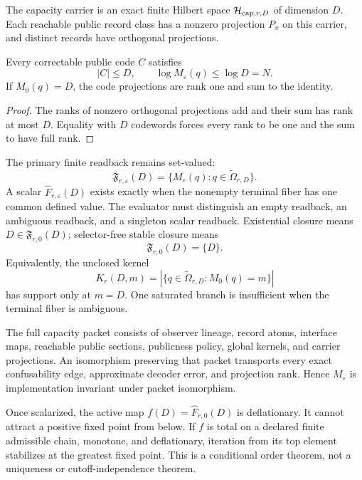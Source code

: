 The capacity carrier is an exact finite Hilbert space
\(\mathcal H_{{\rm cap},r,D}\) of dimension \(D\). Each reachable public
record class has a nonzero projection \(P_x\) on this carrier, and distinct
records have orthogonal projections.

\begin{theorem}
\label{thm:public-capacity-carrier-bound}
Every correctable public code \(C\) satisfies
\[
|C|\le D,
\qquad
\log M_\varepsilon(q)\le\log D=N.
\]
If \(M_0(q)=D\), the code projections are rank one and sum to the identity.
\end{theorem}

\begin{proof}
The ranks of nonzero orthogonal projections add and their sum has rank at
most \(D\). Equality with \(D\) codewords forces every rank to be one and
the sum to have full rank.
\end{proof}

The primary finite readback remains set-valued:
\[
\boxed{
\mathfrak F_{r,\varepsilon}(D)=
\{M_\varepsilon(q):q\in\widetilde\Omega_{r,D}\}.
}
\]
A scalar \(\widehat F_{r,\varepsilon}(D)\) exists exactly when the nonempty
terminal fiber has one common defined value. The evaluator must distinguish
an empty readback, an ambiguous readback, and a singleton scalar readback.
Existential closure means \(D\in\mathfrak F_{r,0}(D)\); selector-free stable
closure means
\[
\boxed{\mathfrak F_{r,0}(D)=\{D\}.}
\]
Equivalently, the unclosed kernel
\[
K_r(D,m)=
|\{q\in\widetilde\Omega_{r,D}:M_0(q)=m\}|
\]
has support only at \(m=D\). One saturated branch is insufficient when the
terminal fiber is ambiguous.

The full capacity packet consists of observer lineage, record atoms,
interface maps, reachable public sections, publicness policy, global kernels,
and carrier projections. An isomorphism preserving that packet transports
every exact confusability edge, approximate decoder error, and projection
rank. Hence \(M_\varepsilon\) is implementation invariant under packet
isomorphism.

Once scalarized, the active map
\(f(D)=\widehat F_{r,0}(D)\) is deflationary. It cannot attract a positive
fixed point from below. If \(f\) is total on a declared finite admissible
chain, monotone, and deflationary, iteration from its top element stabilizes
at the greatest fixed point. This is a conditional order theorem, not a
uniqueness or cutoff-independence theorem.

